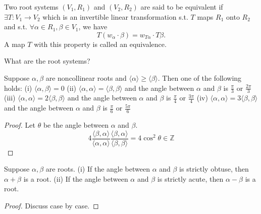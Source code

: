 \begin{definition}[Equivalence]
    Two root systems $(V_1,R_1)$ and $(V_2,R_2)$ are said to be equivalent if $\exists T:V_1\to V_2$ which is an invertible linear transformation
    s.t. $T$ maps $R_1$ onto $R_2$ and s.t. $\forall \alpha\in R_1,\beta\in V_1$, we have 
    \[ T(w_\alpha\cdot \beta)=w_{T\alpha}\cdot T\beta.\] 
    A map $T$ with this property is called an equivalence.
\end{definition}

What are the root systems?
\begin{theorem}\label{4 cases}
    Suppose $\alpha,\beta$ are noncollinear roots and $\langle\alpha\rangle\geq\langle\beta\rangle$. Then one of the following holds:\newline 
    (i) $\langle \alpha,\beta\rangle=0$ \newline 
    (ii) $\langle \alpha,\alpha\rangle=\langle \beta,\beta\rangle$ and the angle between $\alpha$ and $\beta$ is $\frac{\pi}{3}$ or $\frac{2\pi}{3}$\newline 
    (iii) $\langle \alpha,\alpha\rangle=2\langle \beta,\beta\rangle$ and the angle between $\alpha$ and $\beta$ is $\frac{\pi}{4}$ or $\frac{3\pi}{4}$\newline 
    (iv) $\langle \alpha,\alpha\rangle=3\langle \beta,\beta\rangle$ and the angle between $\alpha$ and $\beta$ is $\frac{\pi}{6}$ or $\frac{5\pi}{6}$
\end{theorem}
\begin{proof}
    Let $\theta$ be the angle between $\alpha$ and $\beta$.
    \[4\frac{\langle\beta,\alpha\rangle}{\langle\alpha,\alpha\rangle}\frac{\langle\beta,\alpha\rangle}{\langle\beta,\beta\rangle}=4\cos^2\theta\in \mathbb{Z}\]
\end{proof}
\begin{corollary}\label{a+b}
    Suppose $\alpha,\beta$ are roots. \newline
    (i) If the angle between $\alpha$ and $\beta$ is strictly obtuse, then $\alpha+\beta$ is a root.\newline 
    (ii) If the angle between $\alpha$ and $\beta$ is strictly acute, then $\alpha-\beta$ is a root.
\end{corollary}
\begin{proof}
    Discuss case by case.
\end{proof}

